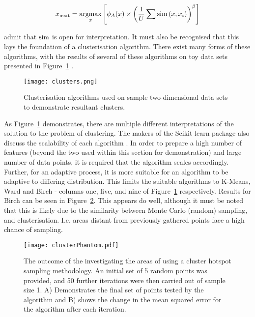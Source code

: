 \begin{equation}
    \label{eq:Settles_density}
    x_\mathrm{next}=\operatorname*{argmax}_x{\left[\phi_A(x)\times{\left(\frac{1}{U}\sum{\operatorname*{sim}{(x, x_i)}}\right)}^\beta\right]}
\end{equation}

\textcite{Set08} admit that $\operatorname*{sim}$ is open for interpretation. It must also be recognised that this lays the foundation of a clusterisation algorithm. There exist many forms of these algorithms, with the results of several of these algorithms on toy data sets presented in Figure~\ref{fig:ClusterResults} \cite{SciClus}.

\begin{figure}[H]
    \begin{center}
        \texttt{[image: clusters.png]}
        \caption[]{Clusterisation algorithms used on sample two-dimensional data sets to demonstrate resultant clusters.}
        \label{fig:ClusterResults}
    \end{center}
\end{figure}

As Figure~\ref{fig:ClusterResults} demonstrates, there are multiple different interpretations of the solution to the problem of clustering. The makers of the Scikit learn package also discuss the scalability of each algorithm \cite{SciClus}. In order to prepare a high number of features (beyond the two used within this section for demonstration) and large number of data points, it is required that the algorithm scales accordingly. Further, for an adaptive process, it is more suitable for an algorithm to be adaptive to differing distribution. This limits the suitable algorithms to K-Means, Ward and Birch - columns one, five, and nine of Figure~\ref{fig:ClusterResults} respectively. Results for Birch can be seen in Figure~\ref{fig:clusterPhantom}. This appears do well, although it must be noted that this is likely due to the similarity between Monte Carlo (random) sampling, and clusterisation. I.e. areas distant from previously gathered points face a high chance of sampling.

\begin{figure}[H]
    \begin{center}
        \texttt{[image: clusterPhantom.pdf]}
        \caption[Cluster Hotspot Sampling Illustration]{The outcome of the investigating the areas of using a cluster hotspot sampling methodology. An initial set of 5 random points was provided, and 50 further iterations were then carried out of sample size 1. A) Demonstrates the final set of points tested by the algorithm and B) shows the change in the mean squared error for the algorithm after each iteration.}
        \label{fig:clusterPhantom}
    \end{center}
\end{figure}

